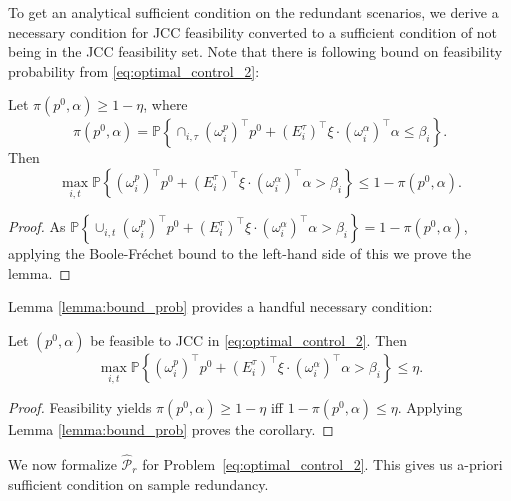 To get an analytical sufficient condition on the redundant scenarios, we derive a necessary condition for JCC feasibility converted to a sufficient condition of not being in the JCC feasibility set. Note that there is following bound on feasibility probability from \eqref{eq:optimal_control_2}:
\begin{lemma}
    \label{lemma:bound_prob}
     Let $\pi(p^0, \alpha) \geq 1 -\eta$, where $$\pi(p^0, \alpha) = \mathbb{P}\left\{ \cap_{i, \tau} (\omega^p_i)^\top p^0 + (E^\tau_i)^\top \xi \cdot(\omega^\alpha_i)^\top \alpha \leq \beta_i\right\}.$$ Then 
    \vspace{-2mm}
    \[\max_{i, t} \mathbb{P} \left\{ (\omega^p_i)^\top p^0 + (E^\tau_i)^\top \xi \cdot (\omega^\alpha_i)^\top \alpha > \beta_i \right\} \leq 1-\pi(p^0, \alpha).\]
\end{lemma}
\begin{proof}
    As $\mathbb{P}\left\{ \cup_{i, t} (\omega^p_i)^\top p^0 + (E^\tau_i)^\top \xi \cdot (\omega^\alpha_i)^\top \alpha > \beta_i \right\} = 1 - \pi(p^0, \alpha)$, applying the Boole-Fréchet bound \cite[Theorem 4.2.1]{williamson1989probabilistic} to the left-hand side of this we prove the lemma.
\end{proof}
Lemma \ref{lemma:bound_prob} provides a handful necessary condition:
\begin{corollary}
    \label{lemma:corollary}
    Let $(p^0, \alpha)$ be feasible to JCC in \eqref{eq:optimal_control_2}. Then $$\max_{i, t} \mathbb{P} \left\{ (\omega^p_i)^\top p^0 + (E^\tau_i)^\top \xi \cdot (\omega^\alpha_i)^\top \alpha > \beta_i \right\} \leq \eta.$$
\end{corollary}
\begin{proof}
    Feasibility yields $\pi(p^0, \alpha) \geq 1 -\eta$ iff $1 - \pi(p^0, \alpha) \leq \eta$. Applying Lemma \ref{lemma:bound_prob} proves the corollary.
\end{proof}


We now formalize $\hat{\mathcal{P}}_r$ for Problem~\eqref{eq:optimal_control_2}. This gives us a-priori sufficient condition on sample redundancy.

